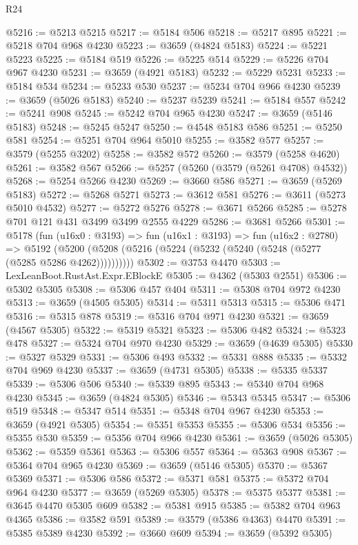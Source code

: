 \begin{lexlean}{R24}
\begin{coremodule}
@5216 := @5213 @5215
@5217 := @5184 @506
@5218 := @5217 @895
@5221 := @5218 @704 @968 @4230
@5223 := @3659 (@4824 @5183)
@5224 := @5221 @5223
@5225 := @5184 @519
@5226 := @5225 @514
@5229 := @5226 @704 @967 @4230
@5231 := @3659 (@4921 @5183)
@5232 := @5229 @5231
@5233 := @5184 @534
@5234 := @5233 @530
@5237 := @5234 @704 @966 @4230
@5239 := @3659 (@5026 @5183)
@5240 := @5237 @5239
@5241 := @5184 @557
@5242 := @5241 @908
@5245 := @5242 @704 @965 @4230
@5247 := @3659 (@5146 @5183)
@5248 := @5245 @5247
@5250 := @4548 @5183 @586
@5251 := @5250 @581
@5254 := @5251 @704 @964 @5010
@5255 := @3582 @577
@5257 := @3579 (@5255 @3202)
@5258 := @3582 @572
@5260 := @3579 (@5258 @4620)
@5261 := @3582 @567
@5266 := @5257 (@5260 (@3579 (@5261 @4708) @4532))
@5268 := @5254 @5266 @4230
@5269 := @3660 @586
@5271 := @3659 (@5269 @5183)
@5272 := @5268 @5271
@5273 := @3612 @581
@5276 := @3611 (@5273 @5010 @4532)
@5277 := @5272 @5276
@5278 := @3671 @5266
@5285 := @5278 @701 @121 @431 @3499 @3499 @2555 @4229
@5286 := @3681 @5266
@5301 := @5178
    (fun (u16x0 : @3193) =>
    fun (u16x1 : @3193) =>
    fun (u16x2 : @2780) =>
    @5192 (@5200 (@5208 (@5216 (@5224 (@5232 (@5240 (@5248 (@5277 (@5285 @5286 @4262))))))))))
@5302 := @3753 @4470
@5303 := LexLeanBoot.RustAst.Expr.EBlockE
@5305 := @4362 (@5303 @2551)
@5306 := @5302 @5305
@5308 := @5306 @457 @404
@5311 := @5308 @704 @972 @4230
@5313 := @3659 (@4505 @5305)
@5314 := @5311 @5313
@5315 := @5306 @471
@5316 := @5315 @878
@5319 := @5316 @704 @971 @4230
@5321 := @3659 (@4567 @5305)
@5322 := @5319 @5321
@5323 := @5306 @482
@5324 := @5323 @478
@5327 := @5324 @704 @970 @4230
@5329 := @3659 (@4639 @5305)
@5330 := @5327 @5329
@5331 := @5306 @493
@5332 := @5331 @888
@5335 := @5332 @704 @969 @4230
@5337 := @3659 (@4731 @5305)
@5338 := @5335 @5337
@5339 := @5306 @506
@5340 := @5339 @895
@5343 := @5340 @704 @968 @4230
@5345 := @3659 (@4824 @5305)
@5346 := @5343 @5345
@5347 := @5306 @519
@5348 := @5347 @514
@5351 := @5348 @704 @967 @4230
@5353 := @3659 (@4921 @5305)
@5354 := @5351 @5353
@5355 := @5306 @534
@5356 := @5355 @530
@5359 := @5356 @704 @966 @4230
@5361 := @3659 (@5026 @5305)
@5362 := @5359 @5361
@5363 := @5306 @557
@5364 := @5363 @908
@5367 := @5364 @704 @965 @4230
@5369 := @3659 (@5146 @5305)
@5370 := @5367 @5369
@5371 := @5306 @586
@5372 := @5371 @581
@5375 := @5372 @704 @964 @4230
@5377 := @3659 (@5269 @5305)
@5378 := @5375 @5377
@5381 := @3645 @4470 @5305 @609
@5382 := @5381 @915
@5385 := @5382 @704 @963 @4365
@5386 := @3582 @591
@5389 := @3579 (@5386 @4363) @4470
@5391 := @5385 @5389 @4230
@5392 := @3660 @609
@5394 := @3659 (@5392 @5305)

\end{coremodule}
\end{lexlean}
